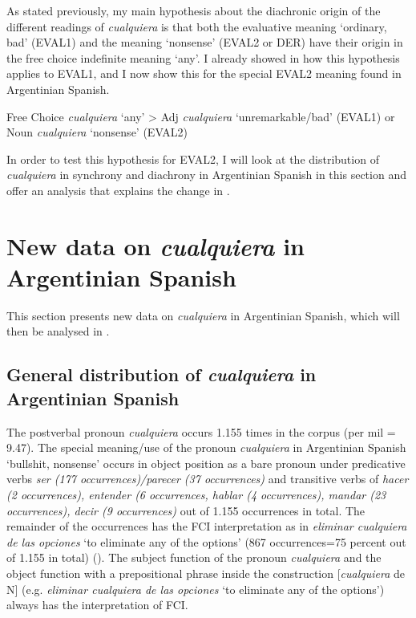 As stated previously, my main hypothesis about the diachronic origin of the different readings of \textit{cualquiera} is that both the evaluative meaning ‘ordinary, bad’ (EVAL1) and the meaning ‘nonsense’ (EVAL2 or DER) have their origin in the free choice indefinite meaning ‘any’. I already showed in  how this hypothesis applies to EVAL1, and I now show this for the special EVAL2 meaning found in Argentinian Spanish.

\ea \label{ex:key:192-1} %
    Free Choice \textit{cualquiera} ‘any’ > Adj \textit{cualquiera} ‘unremarkable/bad’ (EVAL1) or Noun \textit{cualquiera} ‘nonsense’ (EVAL2)
\z

In order to test this hypothesis for EVAL2, I will look at the distribution of \textit{cualquiera} in synchrony and diachrony in Argentinian Spanish in this section and offer an analysis that explains the change in .

\section{{New} {data} {on} {\textit{cualquiera} }{in} {Argentinian} {Spanish}} \label{sec:4.3}

This section presents new data on \textit{cualquiera} in Argentinian Spanish, which will then be analysed in .

\subsection{{General} {distribution} {of} {\textit{cualquiera} }{in} {Argentinian} {Spanish}} \label{sec:4.3.1}

{The postverbal pronoun \textit{cualquiera} occurs 1.155 times in the corpus (per mil = 9.47). The special meaning/use of the pronoun \textit{cualquiera} in Argentinian Spanish ‘bullshit, nonsense’ occurs in object position as a bare pronoun under predicative verbs \textit{ser (177 occurrences)/parecer (37 occurrences)} and transitive verbs of \textit{hacer (2 occurrences), entender (6 occurrences, hablar (4 occurrences), mandar (23 occurrences), decir (9 occurrences)} out of 1.155 occurrences in total. The remainder of the occurrences has the FCI interpretation as in \textit{eliminar cualquiera de las opciones} ‘to eliminate any of the options’ (867 occurrences=75 percent out of 1.155 in total) (). The subject function of the pronoun \textit{cualquiera} and the object function with a prepositional phrase inside the construction [\textit{cualquiera} de N] (e.g. \textit{eliminar cualquiera de las opciones} ‘to eliminate any of the options’) always has the interpretation of FCI.} 

